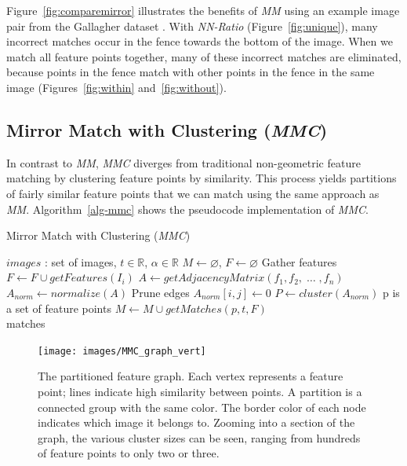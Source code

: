 \documentclass[conference]{IEEEtran}
\begin{document}
Figure~\ref{fig:comparemirror} illustrates the benefits of \emph{MM} 
using an example image pair from the Gallagher dataset 
\cite{gallagher2008}.
With \emph{NN-Ratio} (Figure~\ref{fig:unique}), many incorrect matches 
occur in the fence towards the bottom of the image.
When we match all feature points together, many of these incorrect 
matches are eliminated, because points in the fence match with other 
points in the fence in the same image (Figures~\ref{fig:within} 
and~\ref{fig:without}).
%
\subsection{Mirror Match with Clustering (\emph{MMC})}
%
In contrast to \emph{MM}, \emph{MMC} diverges from traditional 
non-geometric feature matching by clustering feature points by 
similarity. This process yields partitions of fairly similar feature 
points that we can match using the same approach as \emph{MM}.  
Algorithm~\ref{alg-mmc} shows the pseudocode implementation of \emph{MMC}.
%
\begin{algorithm}[htb]
\caption{Mirror Match with Clustering (\emph{MMC})}
\label{alg-mmc}
\begin{algorithmic}
\Require $images$ : set of images, $t \in \mathbb{R}$, $\alpha \in 
\mathbb{R}$
\State $M\gets \varnothing$, $F\gets \varnothing$
 \Comment Gather features
    \State $F\gets F \cup getFeatures(I_i)$
\EndFor
\State $A\gets getAdjacencyMatrix(f_1, f_2,\; \ldots \;, f_n)$
\State $A_{norm}\gets normalize(A)$
 \Comment Prune edges
        \State $A_{norm}[i,j] \gets 0$
    \EndIf
\EndFor
\State $P\gets cluster(A_{norm})$
 \Comment p is a set of feature points
    \State $M\gets M \cup getMatches(p, t, F)$
\EndFor \\
\Return matches
\end{algorithmic}
\end{algorithm}
%
\begin{figure}[ht]
	\centering
    \texttt{[image: images/MMC\_graph\_vert]}
    \caption{The partitioned feature graph. Each vertex represents a 
        feature point; lines indicate high similarity between points. A 
        partition is a connected group with the same color. The border 
        color of each node indicates which image it belongs to.  Zooming 
    into a section of the graph, the various cluster sizes can be seen, 
ranging from hundreds of feature points to only two or three.}
	\label{fig:graph}
\end{figure}
\end{document}
